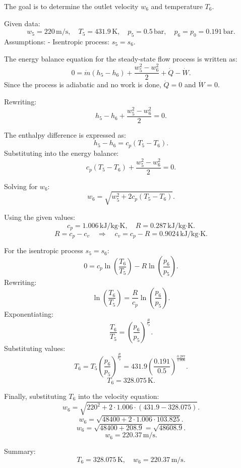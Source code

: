 The goal is to determine the outlet velocity \( w_6 \) and temperature \( T_6 \).  

Given data:  
\[
w_5 = 220 \, \text{m/s}, \quad T_5 = 431.9 \, \text{K}, \quad p_5 = 0.5 \, \text{bar}, \quad p_6 = p_0 = 0.191 \, \text{bar}.
\]  
Assumptions:  
- Isentropic process: \( s_5 = s_6 \).  

The energy balance equation for the steady-state flow process is written as:  
\[
0 = \dot{m} \left( h_5 - h_6 \right) + \frac{w_5^2 - w_6^2}{2} + \dot{Q} - \dot{W}.
\]  
Since the process is adiabatic and no work is done, \( \dot{Q} = 0 \) and \( \dot{W} = 0 \).  

Rewriting:  
\[
h_5 - h_6 + \frac{w_5^2 - w_6^2}{2} = 0.
\]  

The enthalpy difference is expressed as:  
\[
h_5 - h_6 = c_p \left( T_5 - T_6 \right).
\]  
Substituting into the energy balance:  
\[
c_p \left( T_5 - T_6 \right) + \frac{w_5^2 - w_6^2}{2} = 0.
\]  

Solving for \( w_6 \):  
\[
w_6 = \sqrt{w_5^2 + 2 c_p \left( T_5 - T_6 \right)}.
\]  

Using the given values:  
\[
c_p = 1.006 \, \text{kJ/kg·K}, \quad R = 0.287 \, \text{kJ/kg·K}.
\]  
\[
R = c_p - c_v \quad \Rightarrow \quad c_v = c_p - R = 0.9024 \, \text{kJ/kg·K}.
\]  

For the isentropic process \( s_5 = s_6 \):  
\[
0 = c_p \ln \left( \frac{T_6}{T_5} \right) - R \ln \left( \frac{p_6}{p_5} \right).
\]  
Rewriting:  
\[
\ln \left( \frac{T_6}{T_5} \right) = \frac{R}{c_p} \ln \left( \frac{p_6}{p_5} \right).
\]  
Exponentiating:  
\[
\frac{T_6}{T_5} = \left( \frac{p_6}{p_5} \right)^{\frac{R}{c_p}}.
\]  
Substituting values:  
\[
T_6 = T_5 \left( \frac{p_6}{p_5} \right)^{\frac{R}{c_p}} = 431.9 \left( \frac{0.191}{0.5} \right)^{\frac{0.287}{1.006}}.
\]  
\[
T_6 = 328.075 \, \text{K}.
\]  

Finally, substituting \( T_6 \) into the velocity equation:  
\[
w_6 = \sqrt{220^2 + 2 \cdot 1.006 \cdot (431.9 - 328.075)}.
\]  
\[
w_6 = \sqrt{48400 + 2 \cdot 1.006 \cdot 103.825}.
\]  
\[
w_6 = \sqrt{48400 + 208.9} = \sqrt{48608.9}.
\]  
\[
w_6 = 220.37 \, \text{m/s}.
\]  

Summary:  
\[
T_6 = 328.075 \, \text{K}, \quad w_6 = 220.37 \, \text{m/s}.
\]